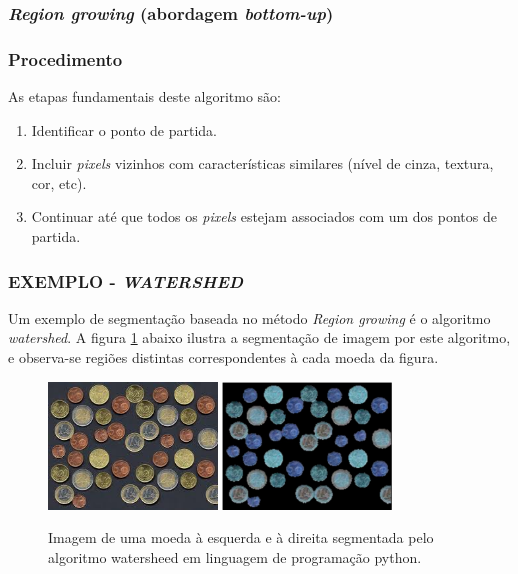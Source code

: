 \subsubsection{\textit{Region growing} (abordagem \textit{bottom-up})}
\subsubsection*{Procedimento}
As etapas fundamentais deste algoritmo são: 
\begin{enumerate}
    \item Identificar o ponto de partida.
    \item Incluir \textit{pixels} vizinhos com características similares (nível de cinza, textura, cor, etc).
    \item Continuar até que todos os \textit{pixels} estejam associados com um dos pontos de partida.
\end{enumerate}

\subsubsection*{EXEMPLO - \textit{WATERSHED}}
Um exemplo de segmentação baseada no método \textit{Region growing} é o algoritmo \textit{watershed}. A figura \ref{fig:coins} abaixo ilustra a segmentação de imagem por este algoritmo, e observa-se regiões distintas correspondentes à cada moeda da figura.

\begin{figure}[!htb]
 \centering
 \def\baselinestretch{1}\small\normalsize
 \includegraphics[width=0.4\textwidth]{img/stf-coins.jpg}\qquad
 \includegraphics[width=0.4\textwidth]{img/stf-coins-watersheed.jpg} 
 \caption{\label{fig:coins}Imagem de uma moeda \citep{stanford} à esquerda e à direita segmentada pelo algoritmo watersheed em linguagem de programação python.}
\end{figure}
 
 


